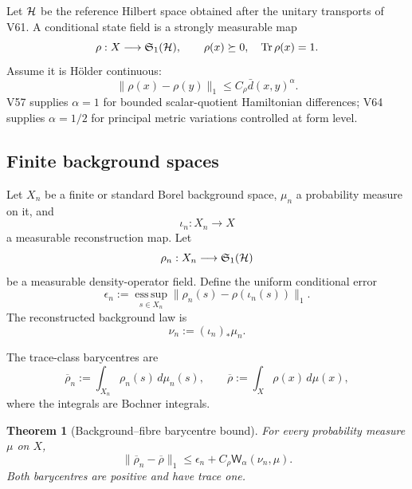 \documentclass[11pt]{article}
\newtheorem{theorem}{Theorem}[section]
\theoremstyle{remark}
\begin{document}
Let \({\cal H}\) be the reference Hilbert space obtained after the
unitary transports of V61.  A conditional state field is a strongly
measurable map
\[
 \rho:X\longrightarrow{\mathfrak S}_1({\cal H}),
 \qquad
 \rho(x)\succeq0,\quad\operatorname{Tr}\rho(x)=1.
\]
Assume it is Hölder continuous:
\begin{equation}
 \|\rho(x)-\rho(y)\|_1
 \leq C_\rho\bar d(x,y)^\alpha.                  \tag{66.3}
\end{equation}
V57 supplies \(\alpha=1\) for bounded scalar-quotient
Hamiltonian differences; V64 supplies \(\alpha=1/2\) for principal
metric variations controlled at form level.

\subsection{Finite background spaces}

Let \(X_n\) be a finite or standard Borel background space,
\(\mu_n\) a probability measure on it, and
\[
 \iota_n:X_n\longrightarrow X
\]
a measurable reconstruction map.  Let
\[
 \rho_n:X_n\longrightarrow{\mathfrak S}_1({\cal H})
\]
be a measurable density-operator field.  Define the uniform
conditional error
\begin{equation}
 \epsilon_n
 :=
 \operatorname*{ess\,sup}_{s\in X_n}
 \|\rho_n(s)-\rho(\iota_n(s))\|_1.                \tag{66.4}
\end{equation}
The reconstructed background law is
\[
                         \nu_n:=(\iota_n)_*\mu_n.
\]

The trace-class barycentres are
\begin{equation}
 \overline\rho_n:=\int_{X_n}\rho_n(s)\,d\mu_n(s),
 \qquad
 \overline\rho:=\int_X\rho(x)\,d\mu(x),            \tag{66.5}
\end{equation}
where the integrals are Bochner integrals.

\begin{theorem}[Background--fibre barycentre bound]
\label{thm:v12v66-barycentre}
For every probability measure \(\mu\) on \(X\),
\begin{equation}
 \boxed{
 \|\overline\rho_n-\overline\rho\|_1
 \leq
 \epsilon_n+C_\rho{\mathsf W}_\alpha(\nu_n,\mu).} \tag{66.6}
\end{equation}
Both barycentres are positive and have trace one.
\end{theorem}
\end{document}
